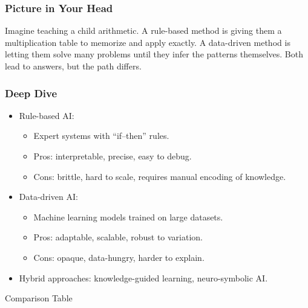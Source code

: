\documentclass[
  letterpaper,
  DIV=11,
  numbers=noendperiod]{scrreprt}
\providecommand{\tightlist}{%
  \setlength{\itemsep}{0pt}\setlength{\parskip}{0pt}}
\begin{document}
\subsubsection{Picture in Your Head}\label{picture-in-your-head-54}

Imagine teaching a child arithmetic. A rule-based method is giving them
a multiplication table to memorize and apply exactly. A data-driven
method is letting them solve many problems until they infer the patterns
themselves. Both lead to answers, but the path differs.

\subsubsection{Deep Dive}\label{deep-dive-54}

\begin{itemize}
\item
  Rule-based AI:

  \begin{itemize}
  \tightlist
  \item
    Expert systems with ``if--then'' rules.
  \item
    Pros: interpretable, precise, easy to debug.
  \item
    Cons: brittle, hard to scale, requires manual encoding of knowledge.
  \end{itemize}
\item
  Data-driven AI:

  \begin{itemize}
  \tightlist
  \item
    Machine learning models trained on large datasets.
  \item
    Pros: adaptable, scalable, robust to variation.
  \item
    Cons: opaque, data-hungry, harder to explain.
  \end{itemize}
\item
  Hybrid approaches: knowledge-guided learning, neuro-symbolic AI.
\end{itemize}

Comparison Table
\end{document}
